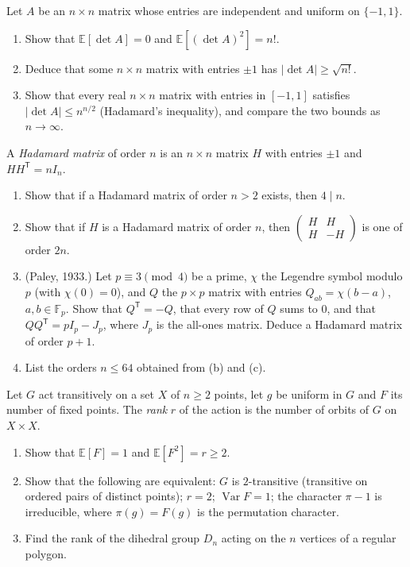 \begin{exercise}[$\star\star$]\label{pb:detsquare}
Let $A$ be an $n\times n$ matrix whose entries are independent and uniform on $\{-1,1\}$.
\begin{enumerate}[label=(\alph*)]
\item Show that $\mathbb E[\det A]=0$ and $\mathbb E[(\det A)^2]=n!$.
\item Deduce that some $n\times n$ matrix with entries $\pm1$ has $|\det A|\ge\sqrt{n!}$.
\item Show that every real $n\times n$ matrix with entries in $[-1,1]$ satisfies $|\det A|\le n^{n/2}$ (Hadamard's
inequality), and compare the two bounds as $n\to\infty$.
\end{enumerate}
\end{exercise}

\begin{exercise}[$\star\star\star$]\label{pb:hadamard}
A \emph{Hadamard matrix} of order $n$ is an $n\times n$ matrix $H$ with entries $\pm1$ and $HH^{\mathsf T}=nI_n$.
\begin{enumerate}[label=(\alph*)]
\item Show that if a Hadamard matrix of order $n>2$ exists, then $4\mid n$.
\item Show that if $H$ is a Hadamard matrix of order $n$, then $\begin{pmatrix}H&H\\H&-H\end{pmatrix}$ is one of order $2n$.
\item (Paley, 1933.) Let $p\equiv3\pmod4$ be a prime, $\chi$ the Legendre symbol modulo $p$ (with $\chi(0)=0$), and $Q$ the
$p\times p$ matrix with entries $Q_{ab}=\chi(b-a)$, $a,b\in\mathbb F_p$. Show that $Q^{\mathsf T}=-Q$, that every row of $Q$
sums to $0$, and that $QQ^{\mathsf T}=pI_p-J_p$, where $J_p$ is the all-ones matrix. Deduce a Hadamard matrix of order $p+1$.
\item List the orders $n\le64$ obtained from (b) and (c).
\end{enumerate}
\end{exercise}

\begin{exercise}[$\star\star$]\label{pb:rank}
Let $G$ act transitively on a set $X$ of $n\ge2$ points, let $g$ be uniform in $G$ and $F$ its number of fixed points. The
\emph{rank} $r$ of the action is the number of orbits of $G$ on $X\times X$.
\begin{enumerate}[label=(\alph*)]
\item Show that $\mathbb E[F]=1$ and $\mathbb E[F^2]=r\ge2$.
\item Show that the following are equivalent: $G$ is $2$-transitive (transitive on ordered pairs of distinct points);
$r=2$; $\operatorname{Var}F=1$; the character $\pi-1$ is irreducible, where $\pi(g)=F(g)$ is the permutation character.
\item Find the rank of the dihedral group $D_n$ acting on the $n$ vertices of a regular polygon.
\end{enumerate}
\end{exercise}

